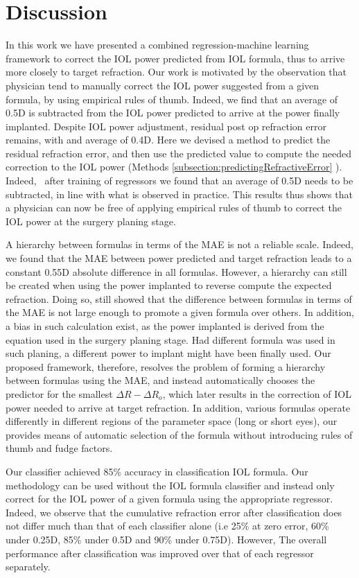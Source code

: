 \documentclass[article,twocolumn,preprint,10pt]{paper}%
\renewcommand{\(}{\left(}
\renewcommand{\)}{\right)}
\renewcommand{\[}{\left[}
\renewcommand{\]}{\right]}
\newcommand{\1}{\mbox{\boldmath$1$}}
\begin{document}
\section{Discussion}\label{section:Discussion}
In this work we have presented a combined regression-machine learning framework to correct the IOL power predicted from IOL formula, thus to arrive more closely to target refraction. Our work is motivated by the observation that physician tend to manually correct the IOL power suggested from a given formula, by using empirical rules of thumb. Indeed, we find that an average of 0.5D is subtracted from the IOL power predicted to arrive at the power finally implanted. Despite IOL power adjustment, residual post op refraction error remains, with and average of 0.4D. Here we devised a method to predict the residual refraction error, and then use the predicted value to compute the needed correction to the IOL power (Methods \ref{subsection:predictingRefractiveError} ). 
Indeed,  after training of regressors we found that an average of 0.5D needs to be subtracted, in line with what is observed in practice. This results thus shows that a physician can now be free of applying empirical rules of thumb to correct the IOL power at the surgery planing stage. 

A hierarchy between formulas in terms of the MAE is not a reliable scale. Indeed, we found that the MAE between power predicted and target refraction leads to a constant 0.55D absolute difference in all formulas. However, a hierarchy can still be created when using the power implanted to reverse compute the expected refraction. Doing so, still showed that the difference between formulas in terms of the MAE is not large enough to promote a given formula over others. In addition, a bias in such calculation exist, as the power implanted is derived from the equation used in the surgery planing stage. Had different formula was used in such planing, a different power to implant might have been finally used.
Our proposed framework, therefore, resolves the problem of forming a hierarchy between formulas  using the MAE, and instead automatically chooses the  predictor for the smallest $\Delta R-\Delta R_o$, which later results in the correction of IOL power needed to arrive at target refraction. 
In addition, various formulas operate differently in different regions of the parameter space (long or short eyes), our provides means of automatic selection of the formula without introducing rules of thumb and fudge factors. 

Our classifier achieved 85\% accuracy in classification IOL formula. Our methodology can be used without the IOL formula classifier and instead only correct for the IOL power of a given formula using the appropriate regressor. Indeed, we observe that the cumulative refraction error after classification does not differ much than that of each classifier alone (i.e 25\% at zero error, 60\% under 0.25D, 85\% under 0.5D and 90\% under 0.75D). However, The overall performance after classification was improved over that of each regressor separately. 
\end{document}
